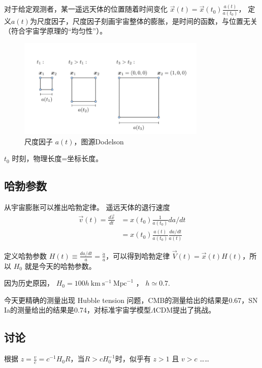\documentclass[]{ctexart}
\begin{document}
对于给定观测者，某一遥远天体的位置随着时间变化 $\vec{x}(t) = \vec{x} (t_0) \frac{a(t)}{a(t_0)}$，
定义$a(t)$为尺度因子，尺度因子刻画宇宙整体的膨胀，是时间的函数，与位置无关（符合宇宙学原理的“均匀性”）。
\begin{figure}[!hbtp]
    \centering
    \includegraphics[width=0.8\textwidth]{figures/scale_factor.png}
    \caption{尺度因子 $a(t)$，图源Dodelson}
    \label{fig:scale_factor}
\end{figure}
$t_0$ 时刻，物理长度=坐标长度。

\subsection{哈勃参数}

从宇宙膨胀可以推出哈勃定律。
遥远天体的退行速度
\begin{equation}
    \begin{aligned} \vec{v}(t)=\frac{d \vec{x}}{d t} &=x\left(t_{0}\right) \frac{1}{a\left(t_{0}\right)} d a / d t \\ &=x\left(t_{0}\right) \frac{a(t)}{a\left(t_{0}\right)} \frac{d a / d t}{a(t)} \end{aligned}
\end{equation}

定义哈勃参数 $H(t) \equiv \frac{da/dt}{a} = \frac{\dot{a}}{a}$，可以得到哈勃定律 $\vec{V}(t)=\vec{x}(t)H(t)$，所以 $H_0$ 就是今天的哈勃参数。


因为历史原因， $H_0 = 100 h \mathrm{~km} \mathrm{~s}^{-1} \mathrm{~Mpc}^{-1}$ ， $h \simeq 0.7$.

今天更精确的测量出现 Hubble tension 问题，CMB的测量给出的结果是0.67，SN Ia的测量给出的结果是0.74，对标准宇宙学模型$\Lambda$CDM提出了挑战。

\subsection{讨论}
根据 $z=\frac{v}{c}=c^{-1} H_0 R$，当$R>c H_0^{-1}$时，似乎有 $z>1$ 且 $v>c$ ……
\end{document}
